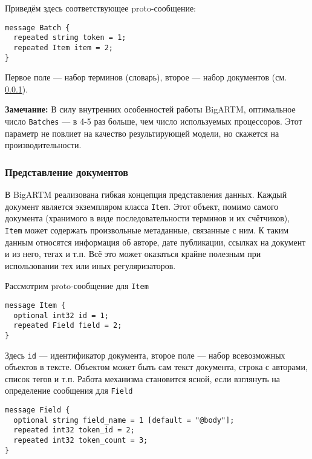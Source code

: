 Приведём здесь соответствующее proto-сообщение:

\vspace{4pt}
\noindent
\verb|message Batch {| \\
\verb|  repeated string token = 1;| \\
\verb|  repeated Item item = 2;| \\
\verb|}|
\vspace{4pt}

Первое поле --- набор терминов (словарь), второе --- набор документов (см. \ref{item_label}).

{\bf Замечание:} В силу внутренних особенностей работы BigARTM, оптимальное число \verb|Batches| --- в 4-5 раз больше, чем число используемых процессоров. Этот параметр не повлиет на качество результирующей модели, но скажется на производительности.

\subsubsection{Представление документов}\label{item_label}
 В BigARTM реализована гибкая концепция представления данных. Каждый документ является экземпляром класса \verb'Item'. Этот объект, помимо самого документа (хранимого в виде последовательности терминов и их счётчиков), \verb'Item' может содержать произвольные метаданные, связанные с ним. К таким данным относятся информация об авторе, дате публикации, ссылках на документ и из него, тегах и т.п. Всё это может оказаться крайне полезным при использовании тех или иных регуляризаторов.
 
 Рассмотрим proto-сообщение для \verb|Item|
   
 \vspace{4pt}
 \noindent
 \verb|message Item {| \\
 \verb|  optional int32 id = 1;| \\
 \verb|  repeated Field field = 2;| \\
 \verb|}|
 \vspace{4pt} 
 
 Здесь \verb|id| --- идентификатор документа, второе поле --- набор всевозможных объектов в тексте. Объектом может быть сам текст документа, строка с авторами, список тегов и т.п. Работа механизма становится ясной, если взглянуть на определение сообщения для \verb|Field|
 
 \vspace{4pt}
 \noindent
 \verb|message Field {| \\
 \verb|  optional string field_name = 1 [default = "@body"];| \\
 \verb|  repeated int32 token_id = 2;| \\
 \verb|  repeated int32 token_count = 3;| \\
 \verb|}|
 \vspace{4pt} 
 
